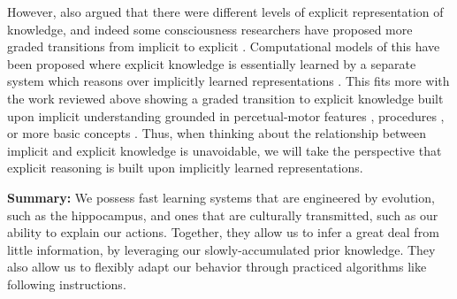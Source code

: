 \documentclass[11pt]{article}
\begin{document}
However, \citet{Karmiloff-Smith1986} also argued that there were different levels of explicit representation of knowledge, and indeed some consciousness researchers have proposed more graded transitions from implicit to explicit \citep[e.g.]{Cleeremans2002}. Computational models of this have been proposed where explicit knowledge is essentially learned by a separate system which reasons over implicitly learned representations \citep{Cleeremans2014}. This fits more with the work reviewed above showing a graded transition to explicit knowledge built upon implicit understanding grounded in percetual-motor features \citep{Goldin-Meadow1993}, procedures \citep{Hazzan1999}, or more basic concepts \citep{Wilensky1991}. Thus, when thinking about the relationship between implicit and explicit knowledge is unavoidable, we will take the perspective that explicit reasoning is built upon implicitly learned representations. \par 
\textbf{Summary:} We possess fast learning systems that are engineered by evolution, such as the hippocampus, and ones that are culturally transmitted, such as our ability to explain our actions. Together, they allow us to infer a great deal from little information, by leveraging our slowly-accumulated prior knowledge. They also allow us to flexibly adapt our behavior through practiced algorithms like following instructions. \par 
\end{document}
